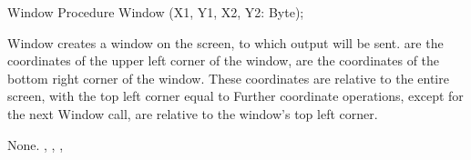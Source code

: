 \latex{}
 \html{}
\begin{procedure}{Window}
\Declaration
Procedure Window (X1, Y1, X2, Y2: Byte);

\Description
 Window creates a window on the screen, to which output will be sent.
 are the coordinates of the upper left corner of the window,
 are the coordinates of the bottom right corner of the window.
These coordinates are relative to the entire screen, with the top left
corner equal to 
Further coordinate operations, except for the next Window call,
are relative to the window's top left corner.

\Errors
None.
\SeeAlso
{}, , , 
\end{procedure}
\latex{}
\html{}
